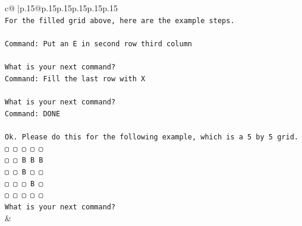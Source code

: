\documentclass{article}
\begin{document}
{\begin{supertabular}{c@{$\;$}|p{.15\linewidth}@{}p{.15\linewidth}p{.15\linewidth}p{.15\linewidth}p{.15\linewidth}p{.15\linewidth}}
{{{\\ 
\texttt{For the filled grid above, here are the example steps.} \\
\\ 
\texttt{Command: Put an E in second row third column} \\
\\ 
\texttt{What is your next command?} \\
\texttt{Command: Fill the last row with X} \\
\\ 
\texttt{What is your next command?} \\
\texttt{Command: DONE} \\
\\ 
\texttt{Ok. Please do this for the following example, which is a 5 by 5 grid.} \\
\texttt{▢ ▢ ▢ ▢ ▢} \\
\texttt{▢ ▢ B B B} \\
\texttt{▢ ▢ B ▢ ▢} \\
\texttt{▢ ▢ ▢ B ▢} \\
\texttt{▢ ▢ ▢ ▢ ▢} \\
\texttt{What is your next command?} \\
            }
        }
    }
    & \\ \\


\end{supertabular}}
\end{document}
